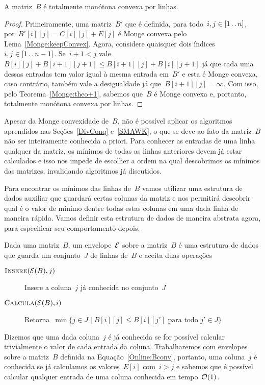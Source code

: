 \begin{prop}
A matriz~$B$ é totalmente monótona convexa por linhas.
\end{prop}

\begin{proof}
Primeiramente, uma matriz~$B'$ que é definida, para todo~$i,j \in [1 \,.\,.\, n]$, por~${B'[i][j] = C[i][j] + E[j]}$ é Monge convexa pelo Lema~\ref{Monge:keepConvex}. Agora, considere quaisquer dois índices~${i,j \in [1 \,.\,.\, n-1]}$. Se~$i + 1 < j$ vale~${B[i][j] + B[i+1][j+1] \leq B[i+1][j] + B[i][j+1]}$ já que cada uma dessas entradas tem valor igual à mesma entrada em~$B'$ e esta é Monge convexa, caso contrário, também vale a desigualdade já que~$B[i+1][j] = \infty$. Com isso, pelo Teorema~\ref{Monge:theo+1}, sabemos que~$B$ é Monge convexa e, portanto, totalmente monótona convexa por linhas.
\end{proof}

Apesar da Monge convexidade de~$B$, não é possível aplicar os algoritmos aprendidos nas Seções~\ref{DivConq} e~\ref{SMAWK}, o que se deve ao fato da matriz~$B$ não ser inteiramente conhecida a priori. Para conhecer as entradas de uma linha qualquer da matriz, os mínimos de todas as linhas anteriores devem já estar calculados e isso nos impede de escolher a ordem na qual descobrimos os mínimos das matrizes, invalidando algoritmos já discutidos.

Para encontrar os mínimos das linhas de~$B$ vamos utilizar uma estrutura de dados auxiliar que guardará certas colunas da matriz e nos permitirá descobrir qual é o valor de mínimo dentre todas estas colunas em uma dada linha de maneira rápida. Vamos definir esta estrutura de dados de maneira abstrata agora, para especificar seu comportamento depois.

\begin{defi}[Envelope]
Dada uma matriz~$B$, um envelope~$\mathcal{E}$ sobre a matriz~$B$ é uma estrutura de dados que guarda um conjunto~$J$ de linhas de~$B$ e aceita duas operações
\begin{description}
\item[$\textsc{Insere}(\mathcal{E}(B),j)$] Insere a coluna~$j$ já conhecida no conjunto~$J$
\item[$\textsc{Calcula}(\mathcal{E}(B),i)$] Retorna~$\min\{j \in J \mid B[i][j] \leq B[i][j'] \text{ para todo } j' \in J\}$
\end{description}
\end{defi}

Dizemos que uma dada coluna~$j$ é já conhecida se for possível calcular trivialmente o valor de cada entrada da coluna. Trabalharemos com envelopes sobre a matriz~$B$ definida na Equação~\ref{Online:Bconv}, portanto, uma coluna~$j$ é conhecida se já calculamos os valores~$E[i]$ com~$i > j$ e sabemos que é possível calcular qualquer entrada de uma coluna conhecida em tempo~$\mathcal{O}(1)$.

